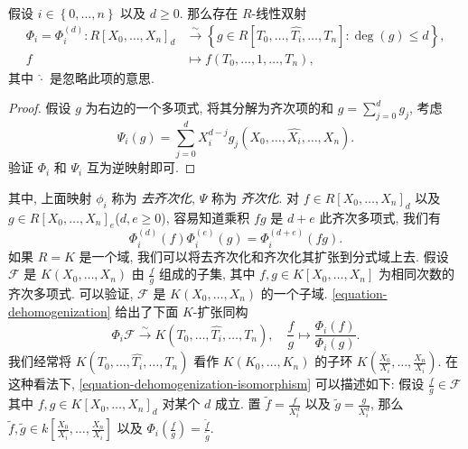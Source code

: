 \begin{lemma}
  假设 \( i \in \left\lbrace 0, \ldots, n \right\rbrace \) 以及 \( d \geq 0 \).
  那么存在 \( R \)-线性双射
  \begin{align*}
    \Phi_i = \Phi^{(d)}_i: R[X_0, \ldots, X_n]_d &\xrightarrow{\sim}
    \left\lbrace g \in R[T_0, \ldots, \widehat{T_i}, \ldots, T_n]: \deg (g) \leq
  d \right\rbrace,\\ f &\mapsto f(T_0, \ldots, 1, \ldots, T_n),
  \end{align*}
  其中 \( \widehat{\cdot} \) 是忽略此项的意思.
\end{lemma}
\begin{proof}
  假设 \( g \) 为右边的一个多项式, 将其分解为齐次项的和 \( g = \sum_{j = 0}^{d}
  g_j \), 考虑
  \[
    \Psi_i(g) = \sum_{j = 0}^{d}X_{i}^{d - j}g_j(X_0, \ldots, \widehat{X_i},
    \ldots, X_n).
  \]
  验证 \( \Phi_i \) 和 \( \Psi_i \) 互为逆映射即可.
\end{proof}
其中, 上面映射 \( \phi_i \) 称为 \emph{去齐次化}, \( \Psi \) 称为 \emph{齐次化}.
对 \( f \in R[X_0, \ldots, X_n]_d \) 以及 \( g \in R[X_0, \ldots, X_n]_e \)(\(
d, e \geq 0 \)), 容易知道乘积 \( fg \) 是 \( d + e \) 此齐次多项式, 我们有
\begin{equation}
  \Phi^{(d)}_i(f) \Phi^{(e)}_i(g) = \Phi^{(d + e)}_i (fg).
  \label{equation-dehomogenization}
\end{equation}
如果 \( R = K \) 是一个域, 我们可以将去齐次化和齐次化其扩张到分式域上去. 假设 \(
\mathcal{F} \) 是 \( K(X_0, \ldots, X_n) \) 由 \( \frac{f}{g} \) 组成的子集,
其中 \( f, g \in K[X_0, \ldots, X_n] \) 为相同次数的齐次多项式. 可以验证, \(
\mathcal{F} \) 是 \( K(X_0, \ldots, X_n) \) 的一个子域.
\eqref{equation-dehomogenization} 给出了下面 \( K \)-扩张同构
\begin{equation}
  \Phi_i \mathcal{F} \xrightarrow{\sim} K(T_0,\ldots, \widehat{T_i}, \ldots,
  T_n),\quad \frac{f}{g} \mapsto \frac{\Phi_i(f)}{\Phi_i(g)}.
  \label{equation-dehomogenization-isomorphism}
\end{equation}
我们经常将 \( K(T_0,\ldots, \widehat{T_i}, \ldots, T_n) \) 看作 \( K(K_0,
\ldots, K_n) \) 的子环 \( K \left( \frac{X_0}{X_i}, \ldots, \frac{X_n}{X_i}
\right) \). 在这种看法下, \eqref{equation-dehomogenization-isomorphism}
可以描述如下: 假设 \( \frac{f}{g} \in \mathcal{F} \) 其中 \( f, g \in K[X_0,
\ldots, X_n]_d \) 对某个 \( d \) 成立. 置 \( \widetilde{f} = \frac{f}{X_i^d} \)
以及 \( \widetilde{g} = \frac{g}{X_i^d} \), 那么 \( \widetilde{f}, \widetilde{g}
\in k \left[ \frac{X_0}{X_i}, \ldots, \frac{X_n}{X_i} \right] \) 以及 \(
\Phi_i\left(\frac{f}{g}\right) = \frac{\widetilde{f}}{\widetilde{g}} \).

